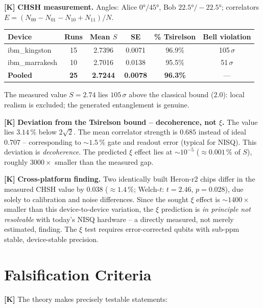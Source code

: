 \textbf{[K]} \textbf{CHSH measurement.} Angles: Alice $0°/45°$, Bob
$22{.}5°/{-}22{.}5°$; correlators $E=(N_{00}-N_{01}-N_{10}+N_{11})/N$.

\begin{center}
\renewcommand{\arraystretch}{1.3}
{\small
\begin{tabular}{lccccc}
\toprule
Device & Runs & Mean $S$ & SE & \% Tsirelson & Bell violation \\
\midrule
ibm\_kingston  & 15 & 2.7396 & 0.0071 & 96.9\% & 105\,$\sigma$ \\
ibm\_marrakesh & 10 & 2.7016 & 0.0138 & 95.5\% & 51\,$\sigma$ \\
\textbf{Pooled} & \textbf{25} & \textbf{2.7244} & \textbf{0.0078}
                 & \textbf{96.3\%} & --- \\
\bottomrule
\end{tabular}
}
\renewcommand{\arraystretch}{1.0}
\end{center}

The measured value $S=2{.}74$ lies $105\,\sigma$ above the classical bound ($2{.}0$):
local realism is excluded; the generated entanglement is genuine.

\textbf{[K]} \textbf{Deviation from the Tsirelson bound -- decoherence, not $\xi$.}
The value lies $3{.}14\,\%$ below $2\sqrt2$. The mean correlator strength is
$0{.}685$ instead of ideal $0{.}707$ -- corresponding to $\sim1{.}5\,\%$ gate and
readout error (typical for NISQ). This deviation is \emph{decoherence}. The
predicted $\xi$ effect lies at $\sim10^{-5}$ ($\approx0{.}001\,\%$ of $S$), roughly
$3000\times$ smaller than the measured gap.

\textbf{[K]} \textbf{Cross-platform finding.} Two identically built Heron-r2 chips
differ in the measured CHSH value by $0{.}038$ ($\approx1{.}4\,\%$; Welch-$t$:
$t=2{.}46$, $p=0{.}028$), due solely to calibration and noise differences. Since
the sought $\xi$ effect is $\sim1400\times$ smaller than this device-to-device
variation, the $\xi$ prediction is \emph{in principle not resolvable} with today's
NISQ hardware -- a directly measured, not merely estimated, finding. The $\xi$
test requires error-corrected qubits with sub-ppm stable, device-stable precision.

\section{Falsification Criteria}

\textbf{[K]} The theory makes precisely testable statements:

